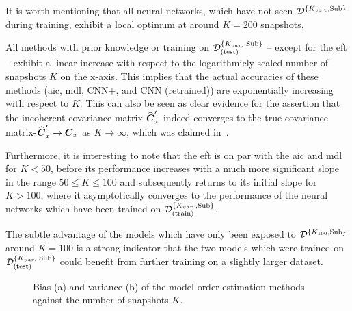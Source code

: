It is worth mentioning that all neural networks, which have not seen \( \mathcal{D}^{\{K_{var.},\text{Sub}\}} \) during training, exhibit
a local optimum at around \( K = 200 \) snapshots.

All methods with prior knowledge or training on \( \mathcal{D}^{\{K_{var.},\text{Sub}\}}_{(\text{test})} \) -- except for the \gls{eft} -- exhibit a
linear increase with respect to the logarithmicly scaled number of snapshots \( K \) on the x-axis.
This implies that the actual accuracies of these methods (\gls{aic}, \gls{mdl}, CNN+, and CNN (retrained)) are
exponentially increasing with respect to \( K \). This can also be seen as clear evidence for the assertion that the
incoherent covariance matrix \( \widehat{\boldsymbol{C}}'_x \) indeed converges to the true covariance matrix-\( \widehat{\boldsymbol{C}}'_x \rightarrow \boldsymbol{C}_x \) as \( K \rightarrow \infty \),
which was claimed in~\cite{meyer}.

Furthermore, it is interesting to note that the \gls{eft} is on par with the \gls{aic} and \gls{mdl} for \( K < 50 \),
before its performance increases with a much more significant slope in the range \(50 \leq K \leq 100\) and subsequently
returns to its initial slope for \( K > 100 \), where it asymptotically converges to the performance of the neural networks
which have been trained on \( \mathcal{D}^{\{K_{var.},\text{Sub}\}}_{(\text{train})} \).

The subtle advantage of the models which have only been exposed to \( \mathcal{D}^{\{K_{100},\text{Sub}\}} \) around \( K = 100 \) is a strong indicator
that the two models which were trained on \( \mathcal{D}^{\{K_{var.},\text{Sub}\}}_{(\text{test})} \) could benefit from further training on a slightly
larger dataset.


\begin{figure}[H]
    \centering
    \caption{Bias (a) and variance (b) of the model order estimation methods against the number of snapshots \( K \).}
    \label{fig:var_num_snapshots/bias_var}
\end{figure}

